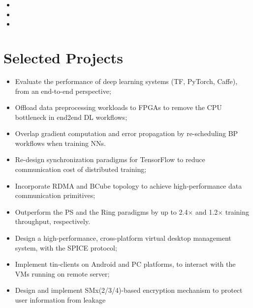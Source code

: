 \documentclass{resume}
\begin{document}
\begin{itemize}
	\item {}
	\item {}	
	\item {}
\end{itemize}


\section{Selected Projects}
\begin{itemize}
	\item Evaluate the performance of deep learning systems (TF, PyTorch, Caffe), from an end-to-end perspective;
	\item Offload data preprocessing workloads to FPGAs to remove the CPU bottleneck in end2end DL workflows;
	\item Overlap gradient computation and error propagation by re-scheduling BP workflows when training NNs.
\end{itemize}

\begin{itemize}
	\item Re-design synchronization paradigms for TensorFlow to reduce communication cost of distributed training;
	\item Incorporate RDMA and BCube topology to achieve high-performance data communication primitives;
	\item Outperform the PS and the Ring paradigms by up to 2.4$\times$ and 1.2$\times$ training throughput, respectively.
\end{itemize}

\begin{itemize}
	\item Design a high-performance, cross-platform virtual desktop management system, with the SPICE protocol;
	\item Implement tin-clients on Android and PC platforms,  to interact with the VMs running on remote server;
	\item Design and implement SMx(2/3/4)-based encryption mechanism to protect user information from leakage
\end{itemize}
\end{document}
